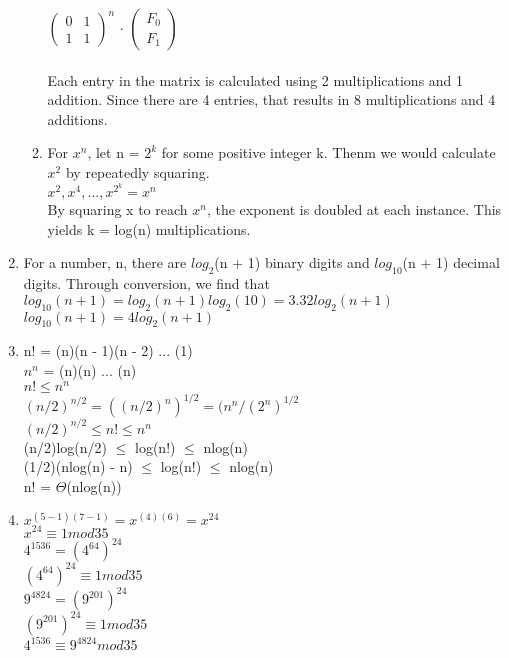 \documentclass{article}
\begin{document}
\begin{enumerate}
\begin{enumerate}
		$\begin{pmatrix}
		0 & 1 \\
		1 & 1
		\end{pmatrix}^{\!\!n}$
		$\cdot$ %
		$\begin{pmatrix}
		F_{0}\\
		F_{1}
		\end{pmatrix}$\\ \\
		Each entry in the matrix is calculated using 2 multiplications and 1 addition. Since there are 4 entries, that results in 8 multiplications and 4 additions.
		\item For $x^{n}$, let n = $2^{k}$ for some positive integer k. Thenm we would calculate $x^{2}$ by repeatedly squaring.\\
		$x^{2}, x^{4}, ... , x^{2^{k}} = x^{n}$\\
		By squaring x to reach $x^{n}$, the exponent is doubled at each instance. This yields k = log(n) multiplications.
	\end{enumerate}
	\item For a number, n, there are $log_{2}$(n + 1) binary digits and $log_{10}$(n + 1) decimal digits. Through conversion, we find that \\
	$log_{10}(n + 1) = log_{2}(n + 1)log_{2}(10) = 3.32log_{2}(n+1)$\\
	$log_{10}(n + 1) = 4log_{2}(n + 1)$
	\clearpage
	\item n! = (n)(n - 1)(n - 2) ... (1)\\
	$n^{n}$ = (n)(n) ... (n)\\
	$n! \leq n^{n}$\\
	$(n/2)^{n/2} = ((n/2)^{n})^{1/2} = (n^{n} / (2^{n})^{1/2}$\\
	$(n/2)^{n/2} \leq n! \leq n^{n}$\\
	(n/2)log(n/2) $\leq$ log(n!) $\leq$ nlog(n)\\
	(1/2)(nlog(n) - n) $\leq$ log(n!) $\leq$ nlog(n)\\
	n! = $\Theta$(nlog(n))
	\item $x^{(5-1)(7-1)} = x^{(4)(6)} = x^{24}$\\
	$x^{24} \equiv 1 mod 35$\\
	$4^{1536} = (4^{64})^{24}$\\
	$(4^{64})^{24} \equiv  1 mod 35$\\
	$9^{4824} = (9^{201})^{24}$\\
	$(9^{201})^{24} \equiv 1 mod 35$\\
	$4^{1536} \equiv 9^{4824} mod 35$\\

\end{enumerate}
\end{document}
